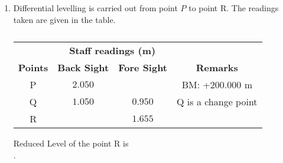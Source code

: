 \documentclass[journal,12pt,onecolumn]{article}
\theoremstyle{remark}
\begin{document}
\begin{enumerate}
    \hfill{}
    
    \item Differential levelling is carried out from point $P$  to point R.
    The readings taken are given in the table.
    \begin{table}[H]
        \centering
        \begin{tabular}{|c|c|c|c|}
        \hline
        & \multicolumn{2}{c|}{\textbf{Staff readings (m)}} & \\ \cline{2-3}
        \textbf{Points} & \textbf{Back Sight} & \textbf{Fore Sight} & \textbf{Remarks} \\ \hline
        P & \brak{\text{-}}$2.050$ & & BM: +$200.000$ m \\
        Q & $1.050$ & $0.950$ & Q is a change point \\
        R & & \brak{\text{-}}$1.655$ & \\ \hline
        \end{tabular}
        \caption{}
        \label{tab:q65}
    \end{table}
    Reduced Level  of the point R is \underline{\hspace{2cm}} \\ .
    
    \hfill{}

\end{enumerate}
\end{document}
